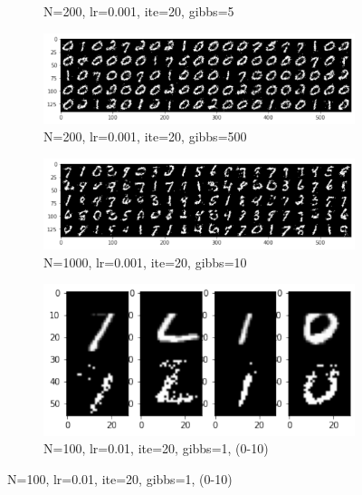 \documentclass{article}
\begin{document}
\begin{figure}[h!]
\begin{subfigure}[b]{0.3\textwidth}
         \caption{N=200, lr=0.001, ite=20, gibbs=5}
         \label{fig:noise5ite10}
     \end{subfigure}
     \hfill
     \begin{subfigure}[b]{0.3\textwidth}
         \centering
         \includegraphics[width=\textwidth]{lab4/200_0.001_20_500.pdf}
         \caption{N=200, lr=0.001, ite=20, gibbs=500}
         \label{fig:noise5ite100}
     \end{subfigure}
     \hfill
     \begin{subfigure}[b]{0.3\textwidth}
         \centering
         \includegraphics[width=\textwidth]{lab4/1000_0.001_20_10.pdf}
         \caption{N=1000, lr=0.001, ite=20, gibbs=10}
         \label{fig:noise5ite500}
     \end{subfigure}
     \begin{subfigure}[b]{0.3\textwidth}
         \centering
         \includegraphics[width=\textwidth]{lab4/100_0.01_20_1_0-10.pdf}
         \caption{N=100, lr=0.01, ite=20, gibbs=1, (0-10)}
         \label{fig:noise10ite10}
     \end{subfigure}

\end{figure}
\end{document}
